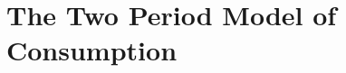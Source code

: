\documentclass[12pt,a4paper,twoside,openright]{article}
\begin{document}
\newpage


\newpage
\tableofcontents

\newpage
\section{The Two Period Model of Consumption}
\end{document}
